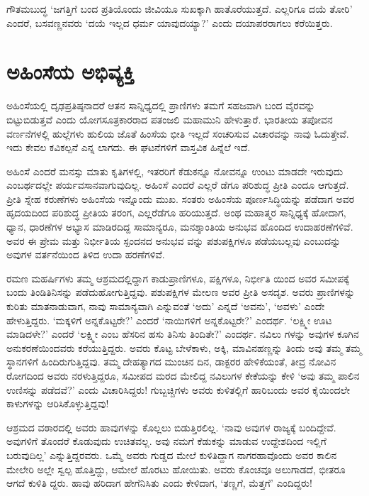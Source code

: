 ಗೌತಮಬುದ್ಧ ‘ಜಗತ್ತಿಗೆ ಬಂದ ಪ್ರತಿಯೊಂದು ಜೀವಿಯೂ ಸುಖಕ್ಕಾಗಿ ಹಾತೊರೆಯುತ್ತದೆ. ಎಲ್ಲರಿಗೂ ದಯೆ ತೋರಿ’ ಎಂದರೆ, ಬಸವಣ್ಣನವರು ‘ದಯೆ ಇಲ್ಲದ ಧರ್ಮ ಯಾವುದಯ್ಯಾ?’ ಎಂದು ದಯಾಪರರಾಗಲು ಕರೆಯಿತ್ತರು.


\section{ಅಹಿಂಸೆಯ ಅಭಿವ್ಯಕ್ತಿ}

ಅಹಿಂಸೆಯಲ್ಲಿ ದೃಢಪ್ರತಿಷ್ಠನಾದರೆ ಆತನ ಸಾನ್ನಿಧ್ಯದಲ್ಲಿ ಪ್ರಾಣಿಗಳು ತಮಗೆ ಸಹಜವಾಗಿ ಬಂದ ವೈರವನ್ನು ಬಿಟ್ಟುಬಿಡುತ್ತವೆ ಎಂದು ಯೋಗಸೂತ್ರಕಾರರಾದ ಪತಂಜಲಿ ಮಹಾಮುನಿ ಹೇಳುತ್ತಾರೆ. ಭಾರತೀಯ ತಪೋವನ ವರ್ಣನೆಗಳಲ್ಲಿ ಹುಲ್ಲೆಗಳು ಹುಲಿಯ ಜೊತೆ ಹಿಂಸೆಯ ಭೀತಿ ಇಲ್ಲದೆ ಸಂಚರಿಸುವ ವಿಚಾರವನ್ನು ನಾವು ಓದುತ್ತೇವೆ. ಇದು ಕೇವಲ ಕವಿಕಲ್ಪನೆ ಎನ್ನ ಲಾಗದು. ಈ ಘಟನೆಗಳಿಗೆ ವಾಸ್ತವಿಕ ಹಿನ್ನೆಲೆ ಇದೆ.

ಅಹಿಂಸೆ ಎಂದರೆ ಮನಸ್ಸು ಮಾತು ಕೃತಿಗಳಲ್ಲಿ, ಇತರರಿಗೆ ಕೆಡುಕನ್ನೂ ನೋವನ್ನೂ ಉಂಟು ಮಾಡದೇ ಇರುವುದು ಎಂಬರ್ಥದಲ್ಲೇ ಪರ್ಯವಸಾನವಾಗುವುದಿಲ್ಲ. ಅಹಿಂಸೆ ಎಂದರೆ ಎಲ್ಲರೆ ಡೆಗೂ ಪರಿಶುದ್ಧ ಪ್ರೀತಿ ಎಂದೂ ಆಗುತ್ತದೆ. ಪ್ರೀತಿ ಸ್ನೇಹ ಕರುಣೆಗಳು ಅಹಿಂಸೆಯ ಇನ್ನೊಂದು ಮುಖ. ಸಂತರು ಅಹಿಂಸೆಯ ಪೂರ್ಣಸಿದ್ಧಿಯನ್ನು ಪಡೆದಾಗ ಅವರ ಹೃದಯದಿಂದ ಪರಿಶುದ್ಧ ಪ್ರೀತಿಯ ತರಂಗ, ಎಲ್ಲರೆಡೆಗೂ ಹರಿಯುತ್ತದೆ. ಅಂಥ ಮಹಾತ್ಮರ ಸಾನ್ನಿಧ್ಯಕ್ಕೆ ಹೋದಾಗ, ಧ್ಯಾನ, ಧಾರಣೆಗಳ ಅಭ್ಯಾಸ ಮಾಡಿರದಿದ್ದ ಸಾಮಾನ್ಯರೂ, ಮನಶ್ಶಾಂತಿಯ ಅನುಭವ ಹೊಂದಿದ ಉದಾಹರಣೆಗಳಿವೆ. ಅವರ ಈ ಪ್ರೇಮ ಮತ್ತು ನಿರ್ಭೀತಿಯ ಸ್ಪಂದನದ ಅನುಭವ ವನ್ನು ಪಶುಪಕ್ಷಿಗಳೂ ಪಡೆಯಬಲ್ಲವು ಎಂಬುದನ್ನು ಅವುಗಳ ವರ್ತನೆಯಿಂದ ತಿಳಿದ ಉದಾ ಹರಣೆಗಳಿವೆ.

ರಮಣ ಮಹರ್ಷಿಗಳು ತಮ್ಮ ಆಶ್ರಮದಲ್ಲಿದ್ದಾಗ ಕಾಡುಪ್ರಾಣಿಗಳೂ, ಪಕ್ಷಿಗಳೂ, ನಿರ್ಭೀತಿ ಯಿಂದ ಅವರ ಸಮೀಪಕ್ಕೆ ಬಂದು ತಿಂಡಿತಿನಿಸನ್ನು ಪಡೆದುಹೋಗುತ್ತಿದ್ದವು. ಪಶುಪಕ್ಷಿಗಳ ಮೇಲಣ ಅವರ ಪ್ರೀತಿ ಅಸದೃಶ. ಅವರು ಪ್ರಾಣಿಗಳನ್ನು ಕುರಿತು ಮಾತನಾಡುವಾಗ, ನಾವು ಸಾಮಾನ್ಯವಾಗಿ ಎನ್ನುವಂತೆ ‘ಅದು’ ಎನ್ನದೆ ‘ಅವನು’, ‘ಅವಳು’ ಎಂದೇ ಹೇಳುತ್ತಿದ್ದರು. ‘ಮಕ್ಕಳಿಗೆ ಅನ್ನಕೊಟ್ಟರೇ?’ ಎಂದರೆ ‘ನಾಯಿಗಳಿಗೆ ಅನ್ನಕೊಟ್ಟರೇ?’ ಎಂದರ್ಥ. ‘ಲಕ್ಷ್ಮೀ ಊಟ ಮಾಡಿದಳೇ?’ ಎಂದರೆ ‘ಲಕ್ಷ್ಮೀ ಎಂಬ ಹೆಸರಿನ ಹಸು ತಿನಿಸು ತಿಂದಿತೇ?’ ಎಂದರ್ಥ. ನವಿಲು ಗಳನ್ನು ಅವುಗಳ ಕೂಗಿನ ಅನುಕರಣೆಯಿಂದವರು ಕರೆಯುತ್ತಿದ್ದರು. ಅವರು ಕೊಟ್ಟ ಬೇಳೆಕಾಳು, ಅಕ್ಕಿ, ಮಾವಿನಹಣ್ಣನ್ನು ತಿಂದು ಅವು ತಮ್ಮ ತಮ್ಮ ಸ್ಥಾನಗಳಿಗೆ ಹಿಂದಿರುಗುತ್ತಿದ್ದವು. ತಮ್ಮ ದೇಹತ್ಯಾಗದ ಮುಂಚಿನ ದಿನ, ಡಾಕ್ಟರರ ಹೇಳಿಕೆಯಂತೆ, ತೀವ್ರ ನೋವಿನ ರೋಗದಿಂದ ಅವರು ನರಳುತ್ತಿದ್ದರೂ, ಸಮೀಪದ ಮರದ ಮೇಲಿದ್ದ ನವಿಲುಗಳ ಕೇಕೆಯನ್ನು ಕೇಳಿ ‘ಅವು ತಮ್ಮ ಪಾಲಿನ ಉಣಿಸನ್ನು ಪಡೆದವೆ?’ ಎಂದು ವಿಚಾರಿಸಿದ್ದರು! ಗುಬ್ಬಚ್ಚಿಗಳು ಅವರು ಕುಳಿತಲ್ಲಿಗೆ ಹಾರಿಬಂದು ಅವರ ಕೈಯಿಂದಲೇ ಕಾಳುಗಳನ್ನು ಆರಿಸಿಕೊಳ್ಳುತ್ತಿದ್ದವು!

ಆಶ್ರಮದ ವಠಾರದಲ್ಲಿ ಅವರು ಹಾವುಗಳನ್ನು ಕೊಲ್ಲಲು ಬಿಡುತ್ತಿರಲಿಲ್ಲ. ‘ನಾವು ಅವುಗಳ ರಾಜ್ಯಕ್ಕೆ ಬಂದಿದ್ದೇವೆ. ಅವುಗಳಿಗೆ ತೊಂದರೆ ಕೊಡುವುದು ಉಚಿತವಲ್ಲ. ಅವು ನಮಗೆ ಕೆಡುಕನ್ನು ಮಾಡುವ ಉದ್ದೇಶದಿಂದ ಇಲ್ಲಿಗೆ ಬರುವುದಿಲ್ಲ’ ಎನ್ನುತ್ತಿದ್ದರವರು. ಒಮ್ಮೆ ಅವರು ಗುಡ್ಡದ ಮೇಲೆ ಕುಳಿತಿದ್ದಾಗ ನಾಗರಹಾವೊಂದು ಅವರ ಕಾಲಿನ ಮೇಲೇರಿ ಅಲ್ಲೇ ಸ್ವಲ್ಪ ಹೊತ್ತಿದ್ದು, ಆಮೇಲೆ ಹೊರಟು ಹೋಯಿತು. ಅವರು ಕೊಂಚವೂ ಅಲುಗಾಡದೆ, ಭೀತರೂ ಆಗದೆ ಕುಳಿತಿ ದ್ದರು. ಹಾವು ಹರಿದಾಗ ಹೇಗೆನಿಸಿತು ಎಂದು ಕೇಳಿದಾಗ, ‘ತಣ್ಣಗೆ, ಮೆತ್ತಗೆ’ ಎಂದಿದ್ದರು!


